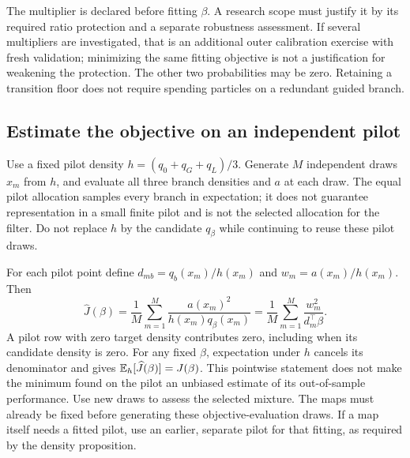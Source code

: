 The multiplier is declared before fitting \(\beta\). A research scope must
justify it by its required ratio protection and a separate robustness
assessment. If several multipliers are investigated, that is an additional
outer calibration exercise with fresh validation; minimizing the same fitting
objective is not a justification for weakening the protection. The other
two probabilities may be zero. Retaining a transition floor does not require
spending particles on a redundant guided branch.

\subsection{Estimate the objective on an independent pilot}

Use a fixed pilot density \(h=(q_0+q_G+q_L)/3\). Generate \(M\) independent
draws \(x_m\) from \(h\), and evaluate all three branch densities and
\(a\) at each draw. The equal pilot allocation samples every branch in
expectation; it does not guarantee representation in a small finite pilot
and is not the selected allocation for the filter. Do not replace \(h\)
by the candidate \(q_\beta\) while continuing to reuse these pilot draws.

For each pilot point define \(d_{mb}=q_b(x_m)/h(x_m)\) and
\(w_m=a(x_m)/h(x_m)\). Then
\begin{equation}
\label{eq:bf-covariance-proposal-beta-pilot}
 \widehat J(\beta)
 =\frac1M\sum_{m=1}^M
       \frac{a(x_m)^2}{h(x_m)q_\beta(x_m)}
 =\frac1M\sum_{m=1}^M\frac{w_m^2}{d_m^\top\beta}.
\end{equation}
A pilot row with zero target density contributes zero, including when its
candidate density is zero. For any fixed \(\beta\), expectation under
\(h\) cancels its denominator
and gives \(\mathbb E_h[\widehat J(\beta)]=J(\beta)\). This pointwise statement
does not make the minimum found on the pilot an unbiased estimate of its
out-of-sample performance. Use new draws to assess the selected mixture.
The maps must already be fixed before generating these objective-evaluation
draws. If a map itself needs a fitted pilot, use an earlier, separate pilot
for that fitting, as required by the density proposition.

